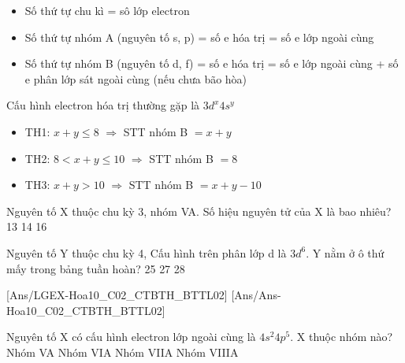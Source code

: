 \begin{pp}
	\begin{itemize}
		\item Số thứ tự chu kì = sô lớp electron
		\item Số thứ tự nhóm A (nguyên tố s, p)  = số e hóa trị = số e lớp ngoài cùng
		\item Số thứ tự nhóm B (nguyên tố d, f)  = số e hóa trị = số e lớp ngoài cùng + số e phân lớp sát ngoài cùng (nếu chưa bão hòa)
	\end{itemize}
	Cấu hình electron hóa trị thường gặp là $3d^x4s^y$
	\begin{itemize}
		\item TH1: $x+y \leq 8 $ $\Rightarrow $ STT nhóm B $=x+y$
		\item TH2: $ 8 <x+y \leq 10 $ $\Rightarrow $ STT nhóm B $=8$
		\item TH3: $x+y > 10 $ $\Rightarrow $ STT nhóm B $=x+y-10$
	\end{itemize}
\end{pp}
\begin{vdex}
	Nguyên tố X thuộc chu kỳ 3, nhóm VA. Số hiệu nguyên tử của X là bao nhiêu?
	\choice
	{13}
	{14}
	{}
	{16}
\end{vdex}
\begin{vdex}
	Nguyên tố Y thuộc chu kỳ 4, Cấu hình trên phân lớp d là $3d^6$. Y nằm ở ô thứ mấy trong bảng tuần hoàn?
	\choice
	{25}
	{}
	{27}
	{28}
\end{vdex}





[Ans/LGEX-Hoa10_C02_CTBTH_BTTL02]
[Ans/Ans-Hoa10_C02_CTBTH_BTTL02]
\hienthiloigiaiex
\begin{ex}%
	Nguyên tố X có cấu hình electron lớp ngoài cùng là $4s^2 4p^5$. X thuộc nhóm nào?
	\choice
	{Nhóm VA}
	{Nhóm VIA}
	{\True Nhóm VIIA}
	{Nhóm VIIIA}
\end{ex}


